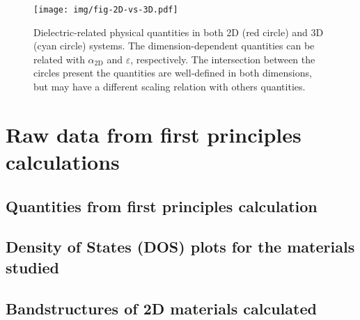 \documentclass[manuscript=suppinfo,email=true,hyperref=true,keywords=false]{achemso}
\begin{document}
\begin{figure}[htbp]
\centering
\texttt{[image: img/fig-2D-vs-3D.pdf]}
\caption{\label{fig-2D-3D} Dielectric-related physical quantities in
  both 2D (red circle) and 3D (cyan circle) systems. The
  dimension-dependent quantities can be related with $\alpha_{\mathrm{2D}}$ and
  $\varepsilon$, respectively. The intersection between the circles
  present the quantities are well-defined in both dimensions, but may have a
  different scaling relation with others quantities.}
\end{figure}

\section{Raw data from first principles calculations}
\subsection{Quantities from first principles calculation}
\label{sec:raw}


\subsection{Density of States (DOS) plots for the materials studied}
\label{sec:DOS}




\subsection{Bandstructures of 2D materials calculated}
\label{sec:bs}




\clearpage{}
\section*{}
\label{sec:ref}

\end{document}
